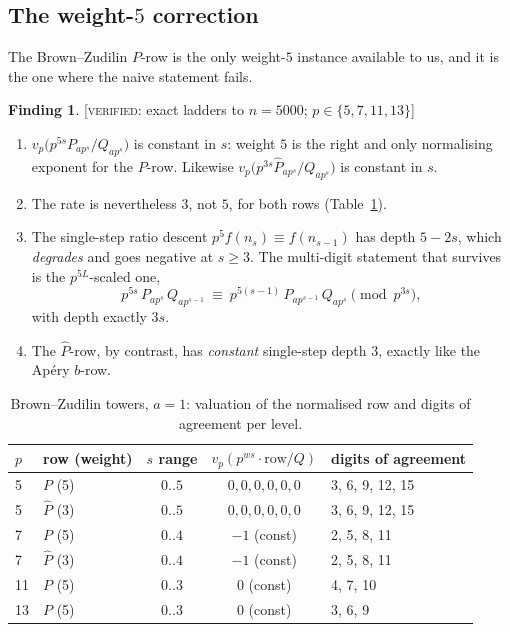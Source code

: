 \documentclass[11pt,reqno]{article}
\newcommand{\Ph}{\widehat{P}}
\newcommand{\vp}{v_p}
\newcommand{\VER}[1]{{\normalfont\textsc{[verified:} #1\textsc{]}}}
\theoremstyle{plain}
\theoremstyle{definition}
\newtheorem{finding}[theorem]{Finding}
\theoremstyle{remark}
\numberwithin{equation}{section}
\begin{document}
\subsection{The weight-$5$ correction}\label{ss:weight5}

The Brown--Zudilin $P$-row is the only weight-$5$ instance available to us, and
it is the one where the naive statement fails.

\begin{finding}\label{find:weight5}
\VER{exact ladders to $n=5000$; $p\in\{5,7,11,13\}$}
\begin{enumerate}[label=(\roman*),leftmargin=2em]
\item $\vp\bigl(p^{5s}P_{ap^s}/Q_{ap^s}\bigr)$ is constant in $s$: weight $5$ is
  the right and only normalising exponent for the $P$-row.  Likewise
  $\vp\bigl(p^{3s}\Ph_{ap^s}/Q_{ap^s}\bigr)$ is constant in $s$.
\item The rate is nevertheless $3$, not $5$, for both rows
  (Table~\ref{tab:bzrate}).
\item The single-step ratio descent $p^{5}f(n_s)\equiv f(n_{s-1})$ has depth
  $5-2s$, which \emph{degrades} and goes negative at $s\ge3$.  The multi-digit
  statement that survives is the $p^{5L}$-scaled one,
  \begin{equation}\label{eq:scaled5}
    p^{5s}\,P_{ap^{s}}\,Q_{ap^{s-1}}
    \ \equiv\ p^{5(s-1)}\,P_{ap^{s-1}}\,Q_{ap^{s}}
    \pmod{p^{3s}},
  \end{equation}
  with depth exactly $3s$.
\item The $\Ph$-row, by contrast, has \emph{constant} single-step depth $3$,
  exactly like the Ap\'ery $b$-row.
\end{enumerate}
\end{finding}

\begin{table}[h]
\centering\small
\caption{Brown--Zudilin towers, $a=1$: valuation of the normalised row and
digits of agreement per level.}
\label{tab:bzrate}
\begin{tabular}{@{}llccl@{}}
\toprule
$p$ & row (weight) & $s$ range & $\vp(p^{ws}\cdot\text{row}/Q)$ & digits of agreement\\
\midrule
5 & $P$ (5) & $0..5$ & $0,0,0,0,0,0$ & 3, 6, 9, 12, 15\\
5 & $\Ph$ (3) & $0..5$ & $0,0,0,0,0,0$ & 3, 6, 9, 12, 15\\
7 & $P$ (5) & $0..4$ & $-1$ (const) & 2, 5, 8, 11\\
7 & $\Ph$ (3) & $0..4$ & $-1$ (const) & 2, 5, 8, 11\\
11 & $P$ (5) & $0..3$ & $0$ (const) & 4, 7, 10\\
13 & $P$ (5) & $0..3$ & $0$ (const) & 3, 6, 9\\
\bottomrule
\end{tabular}
\end{table}
\end{document}
